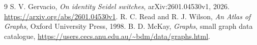 \documentclass[11pt]{article}
\theoremstyle{definition}
\begin{document}
\begin{thebibliography}{9}
 S. V. Gervacio, \emph{On identity Seidel switches},
arXiv:2601.04530v1, 2026. \url{https://arxiv.org/abs/2601.04530v1}.
 R. C. Read and R. J. Wilson, \emph{An Atlas of Graphs},
Oxford University Press, 1998.
 B. D. McKay, \emph{Graphs}, small graph data catalogue,
\url{https://users.cecs.anu.edu.au/~bdm/data/graphs.html}.
\end{thebibliography}
\end{document}
